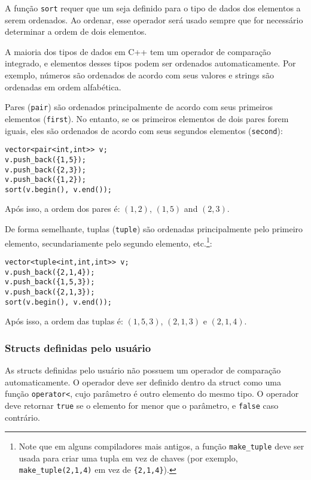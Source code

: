 
A função \texttt{sort} requer que um  seja definido para o tipo de dados
dos elementos a serem ordenados.
Ao ordenar, esse operador será usado sempre que for necessário determinar a ordem de dois elementos.

A maioria dos tipos de dados em C++ tem um operador de comparação integrado, e elementos desses tipos podem ser ordenados automaticamente. Por exemplo, números são ordenados de acordo com seus valores e strings são ordenadas em ordem alfabética.


Pares (\texttt{pair}) são ordenados principalmente de acordo com seus primeiros elementos (\texttt{first}).
No entanto, se os primeiros elementos de dois pares forem iguais, eles são ordenados de acordo com seus segundos elementos (\texttt{second}):
\begin{lstlisting}
vector<pair<int,int>> v;
v.push_back({1,5});
v.push_back({2,3});
v.push_back({1,2});
sort(v.begin(), v.end());
\end{lstlisting}
Após isso, a ordem dos pares é:
$(1,2)$, $(1,5)$ and $(2,3)$.


De forma semelhante, tuplas (\texttt{tuple})
são ordenadas principalmente pelo primeiro elemento,
secundariamente pelo segundo elemento, etc.\footnote{Note que em alguns compiladores mais antigos, a função \texttt{make\_tuple} deve ser usada para criar uma tupla em vez de chaves (por exemplo, \texttt{make\_tuple(2,1,4)} em vez de \texttt{\{2,1,4\}}).}:
\begin{lstlisting}
vector<tuple<int,int,int>> v;
v.push_back({2,1,4});
v.push_back({1,5,3});
v.push_back({2,1,3});
sort(v.begin(), v.end());
\end{lstlisting}
Após isso, a ordem das tuplas é:
$(1,5,3)$, $(2,1,3)$ e $(2,1,4)$.

\subsubsection{Structs definidas pelo usuário}

As structs definidas pelo usuário não possuem um operador de comparação automaticamente.
O operador deve ser definido dentro da struct como uma função
\texttt{operator<},
cujo parâmetro é outro elemento do mesmo tipo.
O operador deve retornar \texttt{true}
se o elemento for menor que o parâmetro,
e \texttt{false} caso contrário.

